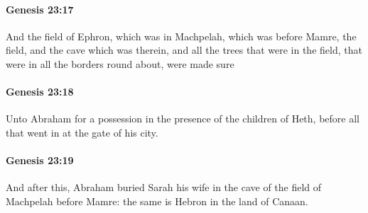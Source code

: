 		\paragraph{Genesis 23:17} %
			\label{GENESIS-23-17}

			And the field of Ephron, which was in Machpelah, which was before Mamre, the field, and the cave which was therein, and all the trees that were in the field, that were in all the borders round about, were made sure


		\paragraph{Genesis 23:18} %
			\label{GENESIS-23-18}

			Unto Abraham for a possession in the presence of the children of Heth, before all that went in at the gate of his city.


		\paragraph{Genesis 23:19} %
			\label{GENESIS-23-19}

			And after this, Abraham buried Sarah his wife in the cave of the field of Machpelah before Mamre: the same is Hebron in the land of Canaan.


